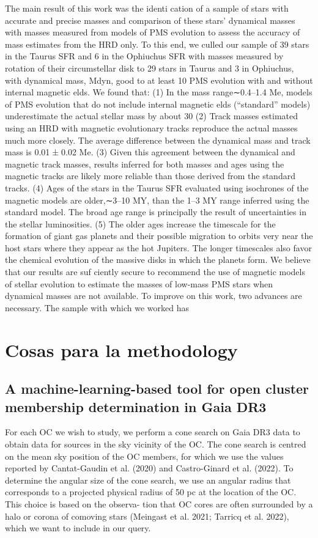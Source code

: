\documentclass[../Main.tex]{subfiles}
\begin{document}
{The main result of this work was the identi cation of a sample
of stars with accurate and precise masses and comparison of
these stars’ dynamical masses with masses measured from
models of PMS evolution to assess the accuracy of mass
estimates from the HRD only. To this end, we culled our sample
of 39 stars in the Taurus SFR and 6 in the Ophiuchus SFR with
masses measured by rotation of their circumstellar disk to 29
stars in Taurus and 3 in Ophiuchus, with dynamical mass, Mdyn,
good to at least 10%
PMS evolution with and without internal magnetic elds.
We found that:
(1) In the mass range∼0.4–1.4 Me, models of PMS evolution
that do not include internal magnetic elds (“standard”
models) underestimate the actual stellar mass by about 30%
(2) Track masses estimated using an HRD with magnetic
evolutionary tracks reproduce the actual masses much
more closely. The average difference between the
dynamical mass and track mass is 0.01±0.02 Me.
(3) Given this agreement between the dynamical and
magnetic track masses, results inferred for both masses
and ages using the magnetic tracks are likely more
reliable than those derived from the standard tracks.
(4) Ages of the stars in the Taurus SFR evaluated using
isochrones of the magnetic models are older,∼3–10 MY,
than the 1–3 MY range inferred using the standard model.
The broad age range is principally the result of
uncertainties in the stellar luminosities.
(5) The older ages increase the timescale for the formation of
giant gas planets and their possible migration to orbits
very near the host stars where they appear as the hot
Jupiters. The longer timescales also favor the chemical
evolution of the massive disks in which the planets form.
We believe that our results are suf ciently secure to
recommend the use of magnetic models of stellar evolution
to estimate the masses of low-mass PMS stars when dynamical
masses are not available. To improve on this work, two
advances are necessary. The sample with which we worked has

\section{Cosas para la methodology}
\subsection{A machine-learning-based tool for open cluster membership determination in Gaia DR3} %
For each OC we wish to study, we perform a cone search on Gaia DR3 data to obtain data for sources in the sky vicinity of the OC. The cone search is centred on the mean sky position of the OC members, for which we use the values reported by Cantat-Gaudin et al. (2020) and Castro-Ginard et al. (2022). To determine the angular size of the cone search, we use an angular radius that corresponds to a projected physical radius of 50 pc at the location of the OC. This choice is based on the observa- tion that OC cores are often surrounded by a halo or corona of comoving stars (Meingast et al. 2021; Tarricq et al. 2022), which we want to include in our query.

}
\end{document}
